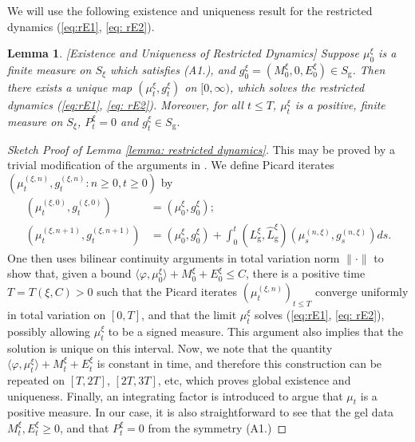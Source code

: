 \documentclass[11pt, notitlepage]{article}
\newtheorem{lem}[thm]{Lemma}
\begin{document}
We will use the following existence and uniqueness result for the restricted dynamics (\ref{eq:rE1}, \ref{eq: rE2}).
\begin{lem}\label{lemma: E and U of Restricted}[Existence and Uniqueness of Restricted Dynamics]\label{lemma: restricted dynamics} Suppose $\mu^\xi_0$ is a finite measure on $S_\xi$ which satisfies ({A1}.), and $g^\xi_0 = (M^\xi_0, 0, E^\xi_0)\in S_\mathrm{g}$. Then there exists a unique map $(\mu^\xi_t, g^\xi_t)$ on $[0, \infty)$, which solves the restricted dynamics (\ref{eq:rE1}, \ref{eq: rE2}). Moreover, for all $t\le T$, $\mu^\xi_t$ is a positive, finite measure on $S_\xi$, $P^\xi_t=0$ and $g^\xi_t \in S_\mathrm{g}$. 
\end{lem}
\begin{proof}[Sketch Proof of Lemma \ref{lemma: restricted dynamics}] This may be proved by a trivial modification of the arguments in \cite[Proposition 2.2]{N99}. We define Picard iterates $(\mu^{(\xi,n)}_t, g^{(\xi,n)}_t: n\ge 0, t\ge 0)$ by \begin{align} (\mu^{(\xi,0)}_t, g^{(\xi,0)}_t)&=(\mu^\xi_0, g^\xi_0);\\ \left(\mu^{(\xi,n+1)}_t, g^{(\xi,n+1)}_t\right)&=(\mu^\xi_0,g^\xi_0)+\int_0^t (L^\xi_\mathrm{g}, \widehat{L}^\xi_\mathrm{g})\left(\mu^{(n,\xi)}_s, g^{(n,\xi)}_s\right) ds. \end{align} One then uses bilinear continuity arguments in total variation norm $\|\cdot\|$ to show that, given a bound $\langle \varphi, \mu^\xi_0\rangle +M^\xi_0+E^\xi_0\le C$, there is a positive time $T=T(\xi,C)>0$ such that the Picard iterates $(\mu^{(\xi,n)}_t)_{t\le T}$ converge uniformly in total variation on $[0,T]$, and that the limit $\mu^\xi_t$ solves (\ref{eq:rE1}, \ref{eq: rE2}), possibly allowing $\mu^\xi_t$ to be a signed measure. This argument also implies that the solution is unique on this interval. Now, we note that the quantity $\langle \varphi, \mu^\xi_t\rangle +M^\xi_t+E^\xi_t$ is constant in time, and therefore this construction can be repeated on $[T, 2T]$, $[2T, 3T]$, etc, which proves global existence and uniqueness. Finally, an integrating factor is introduced to argue that $\mu_t$ is a positive measure.
In our case, it is also straightforward to see that the gel data $M^\xi_t, E^\xi_t \ge 0$, and that $P^\xi_t=0$ from the symmetry ({A1}.)
\end{proof}
\end{document}
